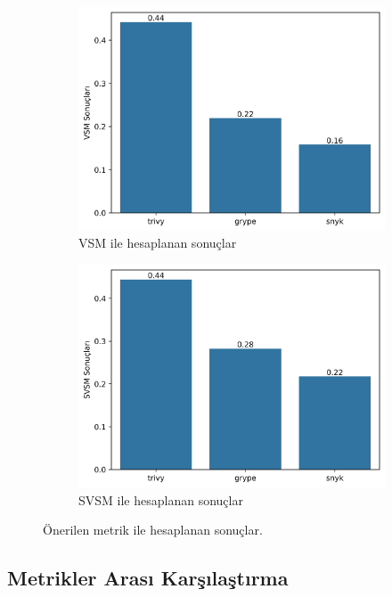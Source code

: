 \begin{figure}
	\centering
	\begin{subfigure}[]{\linewidth/2}
		\includegraphics[width=\linewidth]{images/s1/VSM.png}
		\caption{VSM ile hesaplanan sonuçlar}\label{fig:vsm}
	\end{subfigure}%
	\begin{subfigure}[]{\linewidth/2}
		\includegraphics[width=\linewidth]{images/s1/SVSM.png}
		\caption{SVSM ile hesaplanan sonuçlar}\label{fig:svms}
	\end{subfigure}

	\caption{Önerilen metrik ile hesaplanan sonuçlar.}\label{fig:proposed-metric-results}
\end{figure}

\subsection{Metrikler Arası Karşılaştırma}\label{subsec:ComparisonBetweenMetrics}

